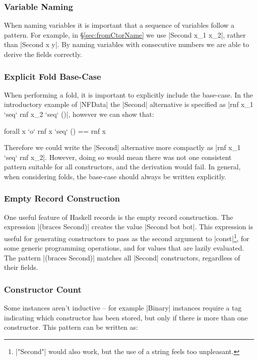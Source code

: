 \documentclass{llncs}
\begin{document}
\subsubsection{Variable Naming}

When naming variables it is important that a sequence of variables follow a pattern. For example, in \S\ref{sec:fromCtorName} we use |Second x_1 x_2|, rather than |Second x y|. By naming variables with consecutive numbers we are able to derive the fields correctly.

\subsubsection{Explicit Fold Base-Case}

When performing a fold, it is important to explicitly include the base-case. In the introductory example of |NFData| the |Second| alternative is specified as |rnf x_1 `seq` rnf x_2 `seq` ()|, however we can show that:

\ignore\begin{code}
forall x `o` rnf x `seq` () == rnf x
\end{code}

Therefore we could write the |Second| alternative more compactly as |rnf x_1 `seq` rnf x_2|. However, doing so would mean there was not one consistent pattern suitable for all constructors, and the derivation would fail. In general, when considering folds, the base-case should always be written explicitly.

\subsubsection{Empty Record Construction}

One useful feature of Haskell records is the empty record construction. The expression |(braces Second)| creates the value |Second bot bot|. This expression is useful for generating constructors to pass as the second argument to |const|\footnote{|"Second"| would also work, but the use of a string feels too unpleasant.}, for some generic programming operations, and for values that are lazily evaluated. The pattern |(braces Second)| matches all |Second| constructors, regardless of their fields.

\subsubsection{Constructor Count}

Some instances aren't inductive -- for example |Binary| instances require a tag indicating which constructor has been stored, but only if there is more than one constructor. This pattern can be written as:
\end{document}
